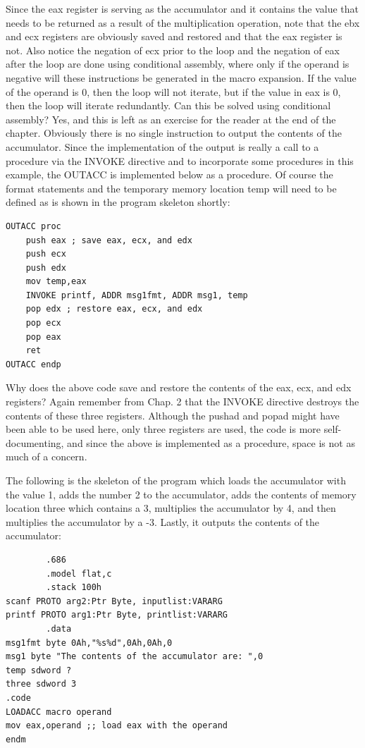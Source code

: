 \documentclass[10pt]{book}
\begin{document}
Since the eax register is serving as the accumulator and it contains the value that needs to be returned as a result of the multiplication operation, note that the ebx and ecx registers are obviously saved and restored and that the eax register is not. Also notice the negation of ecx prior to the loop and the negation of eax after the loop are done using conditional assembly, where only if the operand is negative will these instructions be generated in the macro expansion. If the value of the operand is 0, then the loop will not iterate, but if the value in eax is 0, then the loop will iterate redundantly. Can this be solved using conditional assembly? Yes, and this is left as an exercise for the reader at the end of the chapter.
Obviously there is no single instruction to output the contents of the accumulator. Since the implementation of the output is really a call to a procedure via the INVOKE directive and to incorporate some procedures in this example, the OUTACC is implemented below as a procedure. Of course the format statements and the temporary memory location temp will need to be defined as is shown in the program skeleton shortly:

\begin{verbatim}
OUTACC proc
    push eax ; save eax, ecx, and edx
    push ecx
    push edx
    mov temp,eax
    INVOKE printf, ADDR msg1fmt, ADDR msg1, temp
    pop edx ; restore eax, ecx, and edx
    pop ecx
    pop eax
    ret
OUTACC endp
\end{verbatim}

Why does the above code save and restore the contents of the eax, ecx, and edx registers? Again remember from Chap. 2 that the INVOKE directive destroys the contents of these three registers. Although the pushad and popad might have been able to be used here, only three registers are used, the code is more self-documenting, and since the above is implemented as a procedure, space is not as much of a concern.

The following is the skeleton of the program which loads the accumulator with the value 1, adds the number 2 to the accumulator, adds the contents of memory location three which contains a 3, multiplies the accumulator by 4, and then multiplies the accumulator by a -3. Lastly, it outputs the contents of the accumulator:

\begin{verbatim}
        .686
        .model flat,c
        .stack 100h
scanf PROTO arg2:Ptr Byte, inputlist:VARARG
printf PROTO arg1:Ptr Byte, printlist:VARARG
        .data
msg1fmt byte 0Ah,"%s%d",0Ah,0Ah,0
msg1 byte "The contents of the accumulator are: ",0
temp sdword ?
three sdword 3
.code
LOADACC macro operand
mov eax,operand ;; load eax with the operand
endm
\end{verbatim}
\end{document}
